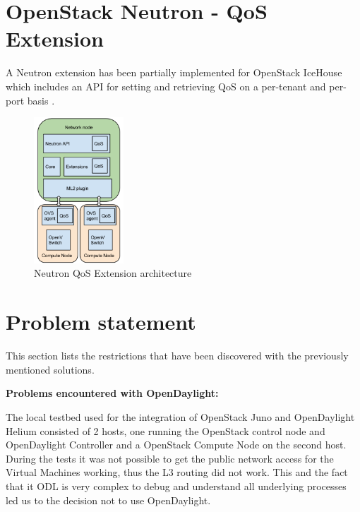 \section{OpenStack Neutron - QoS Extension}

A Neutron extension has been partially implemented for OpenStack IceHouse which includes an API for setting and retrieving QoS on a per-tenant and per-port basis \cite{neutron-qos}.


\begin{figure}[H]
\centering
\includegraphics[width=0.3\textwidth]{images/sota/neutron_qos_extension.png}
\caption{Neutron QoS Extension architecture}
\end{figure}



\section{Problem statement}

This section lists the restrictions that have been discovered with the previously mentioned solutions. 


\textbf{Problems encountered with OpenDaylight:}

The local testbed used for the integration of OpenStack Juno and OpenDaylight Helium consisted of 2 hosts, one running the OpenStack control node and OpenDaylight Controller and a OpenStack Compute Node on the second host. During the tests it was not possible to get the public network access for the Virtual Machines working, thus the L3 routing did not work. This and the fact that it ODL is very complex to debug and understand all underlying processes led us to the decision not to use OpenDaylight.


